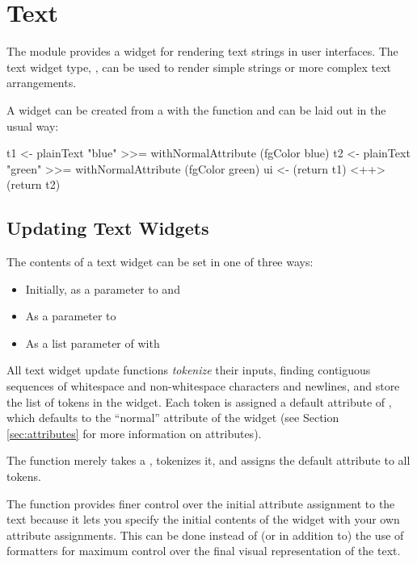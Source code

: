 \section{Text}
\label{sec:text}

The  module provides a widget for rendering text strings in
user interfaces.  The text widget type, , can
be used to render simple strings or more complex text arrangements.

A  widget can be created from a  with the
 function and can be laid out in the usual way:

\begin{haskellcode}
 t1 <- plainText "blue" >>= withNormalAttribute (fgColor blue)
 t2 <- plainText "green" >>= withNormalAttribute (fgColor green)
 ui <- (return t1) <++> (return t2)
\end{haskellcode}

\subsection{Updating Text Widgets}
\label{sec:updatingText}

The contents of a text widget can be set in one of three ways:
\begin{itemize}
\item Initially, as a parameter to  and 
\item As a  parameter to 
\item As a list parameter of  with
\end{itemize}

All text widget update functions \textit{tokenize} their inputs,
finding contiguous sequences of whitespace and non-whitespace
characters and newlines, and store the list of tokens in the widget.
Each token is assigned a default attribute of , which
defaults to the ``normal'' attribute of the widget (see Section
\ref{sec:attributes} for more information on attributes).

The  function merely takes a , tokenizes it,
and assigns the default attribute to all tokens.

The  function provides finer control over the
initial attribute assignment to the text because it lets you specify
the initial contents of the widget with your own attribute
assignments.  This can be done instead of (or in addition to) the use
of formatters for maximum control over the final visual representation
of the text.

